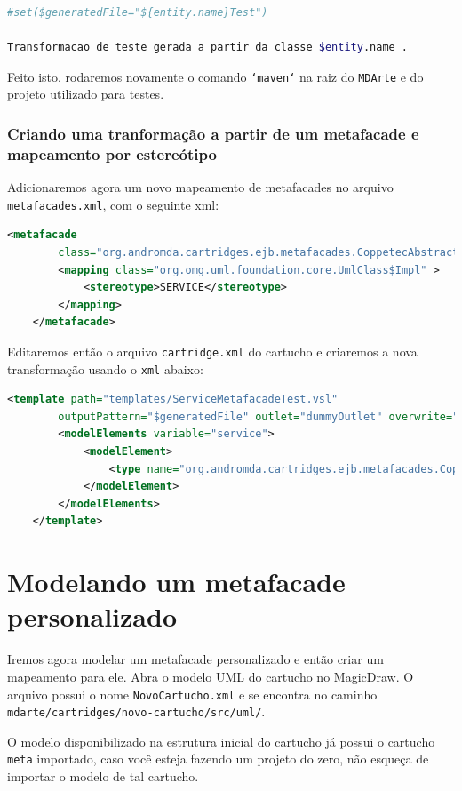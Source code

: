 \begin{lstlisting}[language=bash,
frame=single]
#set($generatedFile="${entity.name}Test")

Transformacao de teste gerada a partir da classe $entity.name .
\end{lstlisting}

Feito isto, rodaremos novamente o comando \texttt{`maven`} na raiz do
\texttt{MDArte} e do projeto utilizado para testes.

\subsubsection{Criando uma tranformação a partir de um metafacade e mapeamento
por estereótipo}
Adicionaremos agora um novo mapeamento de metafacades no arquivo
\texttt{metafacades.xml}, com o seguinte xml:

\begin{lstlisting}[language=xml,
frame=single]
	<metafacade
		class="org.andromda.cartridges.ejb.metafacades.CoppetecAbstractServiceFacadeLogicImpl">
		<mapping class="org.omg.uml.foundation.core.UmlClass$Impl" >
			<stereotype>SERVICE</stereotype> 
		</mapping>
    </metafacade>
\end{lstlisting}


Editaremos então o arquivo \texttt{cartridge.xml} do cartucho e criaremos a nova
transformação usando o \texttt{xml} abaixo:

\begin{lstlisting}[language=xml,
frame=single]
	<template path="templates/ServiceMetafacadeTest.vsl"
		outputPattern="$generatedFile" outlet="dummyOutlet" overwrite="true">
		<modelElements variable="service">
            <modelElement>
                <type name="org.andromda.cartridges.ejb.metafacades.CoppetecAbstractServiceFacadeLogicImpl" />
            </modelElement>
        </modelElements>
    </template>
\end{lstlisting}

\section{Modelando um metafacade personalizado}
Iremos agora modelar um metafacade personalizado e então criar um mapeamento
para ele. Abra o modelo UML do cartucho no MagicDraw. O arquivo possui o nome
\texttt{NovoCartucho.xml} e se encontra no caminho
\texttt{mdarte/cartridges/novo-cartucho/src/uml/}.

O modelo disponibilizado na estrutura inicial do cartucho já possui o cartucho
\texttt{meta} importado, caso você esteja fazendo um projeto do zero, não
esqueça de importar o modelo de tal cartucho.

